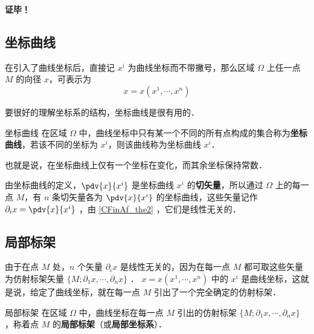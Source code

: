 \textbf{证毕！}
\subsection{坐标曲线}
在引入了曲线坐标后，直接记 $x^i$ 为曲线坐标而不带撇号，那么区域 $\Omega$ 上任一点 $M$ 的向径 $x$，可表示为
\begin{equation}
x=x(x^1,\cdots,x^n)
\end{equation}

要很好的理解坐标系的结构，坐标曲线是很有用的．
\begin{definition}{坐标曲线}
在区域 $\Omega$ 中，曲线坐标中只有某一个不同的所有点构成的集合称为\textbf{坐标曲线}，若该不同的坐标为 $x^i$，则该曲线称为坐标曲线 $x^i$．
\end{definition}
也就是说，在坐标曲线上仅有一个坐标在变化，而其余坐标保持常数．

由坐标曲线的定义，$\pdv{x}{x^i}$ 是坐标曲线 $x^i$ 的\textbf{切矢量}，所以通过 $\Omega$ 上的每一点 $M$，有 $n$ 条切矢量各为 $\pdv{x}{x^i}$ 的坐标曲线，这些矢量记作 $\partial_i x=\pdv{x}{x^i}$ ，由 \autoref{CFinAf_the2} ，它们是线性无关的．
\subsection{局部标架}
由于在点 $M$ 处，$n$ 个矢量 $\partial_i x$ 是线性无关的，因为在每一点 $M$ 都可取这些矢量为仿射标架矢量 $\{M;\partial_1 x,\cdots,\partial_n x\}$ ． $x=x(x^1,\cdots,x^n)$ 中的 $x^i$ 是曲线坐标，这就是说，给定了曲线坐标，就在每一点 $M$ 引出了一个完全确定的仿射标架．
\begin{definition}{局部标架}
在区域 $\Omega$ 中，曲线坐标在每一点 $M$ 引出的仿射标架 $\{M;\partial_1 x,\cdots,\partial_n x\}$ ，称着点 $M$ 的\textbf{局部标架}（或\textbf{局部坐标系}）．
\end{definition} 
